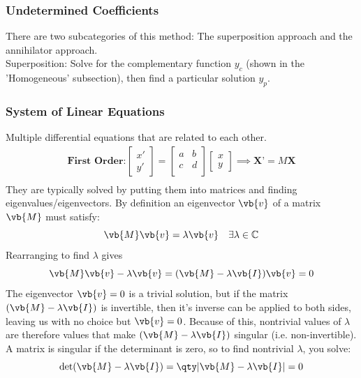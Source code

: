     \subsubsection{Undetermined Coefficients}
        There are two subcategories of this method: The superposition approach and the annihilator approach.\\
        Superposition: Solve for the complementary function $y_c$ (shown in the 'Homogeneous' subsection), then find a particular solution $y_p$.
\subsubsection{System of Linear Equations}
    Multiple differential equations that are related to each other. 
    \begin{align*}
        \textbf{First Order:}%
        \begin{bmatrix}
        x'\\
        y'
        \end{bmatrix}
        =
        \begin{bmatrix}
        a&b\\
        c&d\\
        \end{bmatrix}
        \begin{bmatrix}
        x\\
        y
        \end{bmatrix}\implies \textbf{X'}=M\textbf{X}\\
    \end{align*}
    They are typically solved by putting them into matrices and finding eigenvalues/eigenvectors. By definition an eigenvector $\vb{v}$ of a matrix $\vb{M}$ must satisfy: 
    \[\vb{M}\vb{v}=\lambda\vb{v}\quad\exists\lambda\in\mathbb{C}\]
    Rearranging to find $\lambda$ gives
    \begin{equation*}
        \vb{M}\vb{v}-\lambda\vb{v}=(\vb{M}-\lambda\vb{I})\vb{v}=0
    \end{equation*}
    The eigenvector $\vb{v}=0$ is a trivial solution, but if the matrix $(\vb{M}-\lambda\vb{I})$ is invertible, then it's inverse can be applied to both sides, leaving us with no choice but $\vb{v}=0$. Because of this, nontrivial values of $\lambda$ are therefore values that make $(\vb{M}-\lambda\vb{I})$ singular (i.e. non-invertible). 
    A matrix is singular if the determinant is zero, so to find nontrivial $\lambda$, you solve: 
    \begin{equation*}
        \det(\vb{M}-\lambda\vb{I})=\qty|\vb{M}-\lambda\vb{I}|=0
    \end{equation*}
